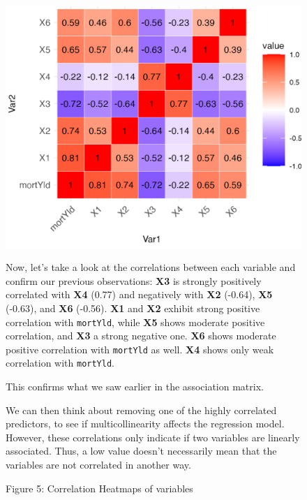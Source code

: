 \documentclass[
  12pt,
]{article}
\begin{document}
\begin{figure}[H]
\centering
\begin{minipage}{0.39\textwidth}
\includegraphics[width=\linewidth]{figures/Figure 5.png}
\captionsetup{font=normalsize}
\caption*{Figure 5: Correlation Heatmaps of variables}
\end{minipage}
\hfill
\begin{minipage}{0.59\textwidth}
\vspace{-1cm}
\small
Now, let's take a look at the correlations between each variable and confirm our previous observations:
\textbf{X3} is strongly positively correlated with \textbf{X4} (0.77) and negatively with \textbf{X2} (-0.64), \textbf{X5} (-0.63), and \textbf{X6} (-0.56).
\textbf{X1} and \textbf{X2} exhibit strong positive correlation with \texttt{mortYld}, while \textbf{X5} shows moderate positive correlation, and \textbf{X3} a strong negative one. \textbf{X6} shows moderate positive correlation with \texttt{mortYld} as well. \textbf{X4} shows only weak correlation with \texttt{mortYld}.


This confirms what we saw earlier in the association matrix.

We can then think about removing one of the highly correlated
predictors, to see if multicollinearity affects the regression model.
However, these correlations only indicate if two variables are linearly
associated. Thus, a low value doesn't necessarily mean that the
variables are not correlated in another way.
\end{minipage}


\end{figure}
\end{document}
